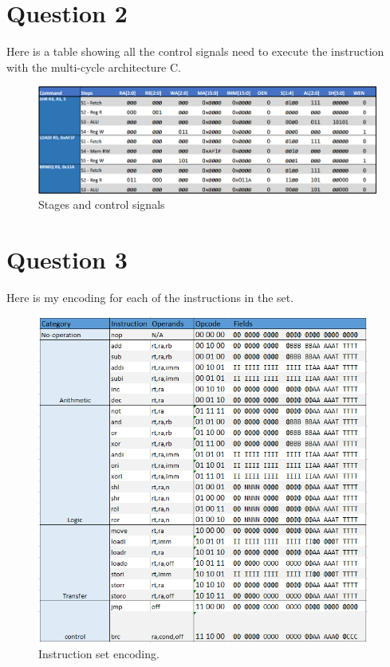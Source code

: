 \documentclass[10pt]{article}
\begin{document}
 
  \section{Question 2}
    	
        Here is a table showing all the control signals need to execute the instruction with the multi-cycle architecture C.
    
        \begin{figure}[ht]
          \centering
          \includegraphics[width=1\textwidth]{tables/Q2ControlSignals}
          \caption{Stages and control signals}
        \end{figure}
        
  \newpage    
  \section{Question 3}
    
    Here is my encoding for each of the instructions in the set.
    
    \begin{figure}[ht]
      \centering
      \includegraphics[width=0.975\textwidth]{tables/InstructionSet}
      \caption{Instruction set encoding.}
    \end{figure}
\end{document}
